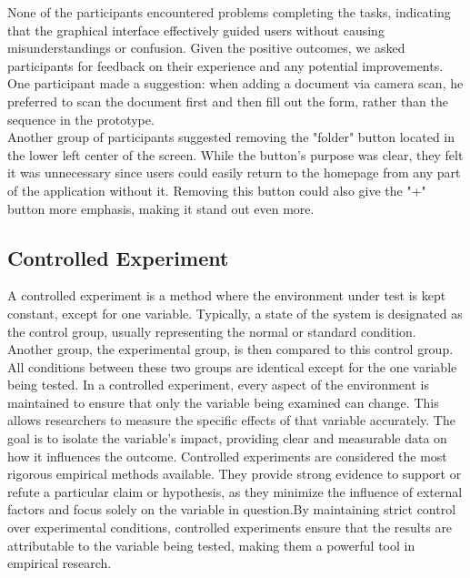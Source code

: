 	\noindent
	None of the participants encountered problems completing the tasks, indicating that the graphical interface effectively guided users without causing misunderstandings or confusion.
	\clearpage
	\noindent
	Given the positive outcomes, we asked participants for feedback on their experience and any potential improvements. One participant made a suggestion: when adding a document via camera scan, he preferred to scan the document first and then fill out the form, rather than the sequence in the prototype.\\
	Another group of participants suggested removing the "folder" button located in the lower left center of the screen. While the button's purpose was clear, they felt it was unnecessary since users could easily return to the homepage from any part of the application without it. Removing this button could also give the "+" button more emphasis, making it stand out even more.	
	
	
	
	
	
	
	
	\subsection{Controlled Experiment}
	A controlled experiment is a method where the environment under test is kept constant, except for one variable. Typically, a state of the system is designated as the control group, usually representing the normal or standard condition. Another group, the experimental group, is then compared to this control group. All conditions between these two groups are identical except for the one variable being tested.\newline
	In a controlled experiment, every aspect of the environment is maintained to ensure that only the variable being examined can change. This allows researchers to measure the specific effects of that variable accurately. The goal is to isolate the variable's impact, providing clear and measurable data on how it influences the outcome.\newline
	Controlled experiments are considered the most rigorous empirical methods available. They provide strong evidence to support or refute a particular claim or hypothesis, as they minimize the influence of external factors and focus solely on the variable in question.By maintaining strict control over experimental conditions, controlled experiments ensure that the results are attributable to the variable being tested, making them a powerful tool in empirical research.
